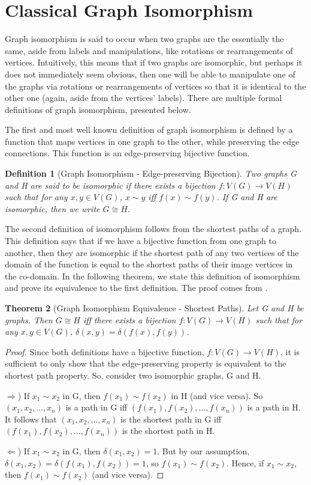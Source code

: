 \documentclass[12pt]{article}
\newtheorem{thm}{Theorem}[section]
\newtheorem{defn}[thm]{Definition}
\begin{document}
\section{Classical Graph Isomorphism} \label{classical}
Graph isomorphism is said to occur when two graphs are the essentially the same, aside from labels and manipulations, like rotations or rearrangements of vertices. Intuitively, this means that if two graphs are isomorphic, but perhaps it does not immediately seem obvious, then one will be able to manipulate one of the graphs via rotations or rearrangements of vertices so that it is identical to the other one (again, aside from the vertices' labels). There are multiple formal definitions of graph isomorphism, presented below.



The first and most well known definition of graph isomorphism is defined by a function that maps vertices in one graph to the other, while preserving the edge connections. This function is an edge-preserving bijective function.
\begin{defn}[Graph Isomorphism - Edge-preserving Bijection]
Two graphs G and H are said to be \textit{isomorphic} if there exists a bijection $f:V(G) \to V(H)$ such that for any $x, y \in V(G)$, $x \sim y$ iff $f(x) \sim f(y)$. If G and H are isomorphic, then we write $G \cong H$.
\end{defn}

The second definition of isomorphism follows from the shortest paths of a graph. This definition says that if we have a bijective function from one graph to another, then they are isomorphic if the shortest path of any two vertices of the domain of the function is equal to the shortest paths of their image vertices in the co-domain. In the following theorem, we state this definition of isomorphism and prove its equivalence to the first definition. The proof comes from \cite{shortest}.

\begin{thm}[Graph Isomorphism Equivalence - Shortest Paths]
\label{shortest}
Let G and H be graphs. Then $G \cong H$ iff there exists a bijection $f:V(G) \to V(H)$ such that for any $x, y \in V(G)$, $\delta(x, y) = \delta(f(x), f(y))$.
\end{thm}

\begin{proof}
Since both definitions have a bijective function, $f:V(G) \to V(H)$, it is sufficient to only show that the edge-preserving property is equivalent to the shortest path property. So, consider two isomorphic graphs, G and H.

$\Rightarrow$) If $x_1 \sim x_2$ in G, then $f(x_1) \sim f(x_2)$ in H (and vice versa). So $(x_1, x_2, ..., x_n)$ is a path in G iff $(f(x_1), f(x_2), ..., f(x_n))$ is a path in H. It follows that $(x_1, x_2, ..., x_n)$ is the shortest path in G iff $(f(x_1), f(x_2), ..., f(x_n))$ is the shortest path in H.

$\Leftarrow$) If $x_1 \sim x_2$ in G, then $\delta(x_1, x_2) = 1$. But by our assumption, $\delta(x_1, x_2) = \delta(f(x_1), f(x_2)) = 1$, so $f(x_1) \sim f(x_2)$. Hence, if $x_1 \sim x_2$, then $f(x_1) \sim f(x_2)$ (and vice versa).
\end{proof}
\end{document}
